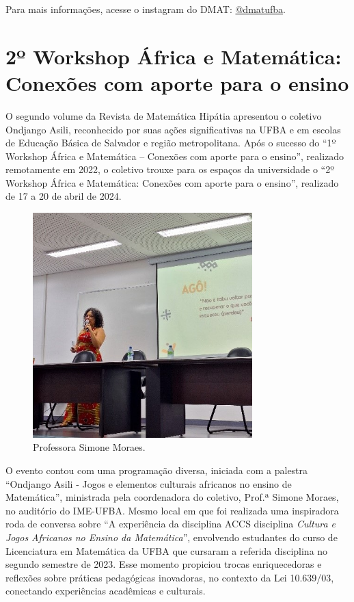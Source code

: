 \documentclass{hipatia}
\begin{document}
Para mais informações, acesse o instagram do DMAT: \href{https://www.instagram.com/dmatufba?igsh=MXJ0NDVjaThwc2IwMQ==}{@dmatufba}.

\section{2º Workshop África e Matemática: Conexões com aporte para o ensino } 

O segundo volume da Revista de Matemática Hipátia apresentou o coletivo Ondjango Asili, reconhecido por suas ações significativas na UFBA e em escolas de Educação Básica de Salvador e região metropolitana. Após o sucesso do ``1º Workshop África e Matemática – Conexões com aporte para o ensino'', realizado remotamente em 2022, o coletivo trouxe para os espaços da universidade o ``2º Workshop África e Matemática: Conexões com aporte para o ensino'', realizado de 17 a 20 de abril de 2024.

\begin{figure}[htb]
    \centering
    \includegraphics[width=8.5cm]{WAM1.jpg}
    \caption{Professora Simone Moraes.}
 \label{WAM1}
\end{figure}

O evento contou com uma programação diversa, iniciada com a palestra ``Ondjango Asili - Jogos e elementos culturais africanos no ensino de Matemática'', ministrada pela coordenadora do coletivo, Prof.ª Simone Moraes, no auditório do IME-UFBA. Mesmo local em que foi realizada uma inspiradora roda de conversa sobre ``A experiência da disciplina ACCS disciplina \textit{Cultura e Jogos Africanos no Ensino da Matemática}'', envolvendo estudantes do curso de Licenciatura em Matemática da UFBA que cursaram a referida disciplina no segundo semestre de 2023. Esse momento propiciou trocas enriquecedoras e reflexões sobre práticas pedagógicas inovadoras, no contexto da Lei 10.639/03, conectando experiências acadêmicas e culturais.
\end{document}
